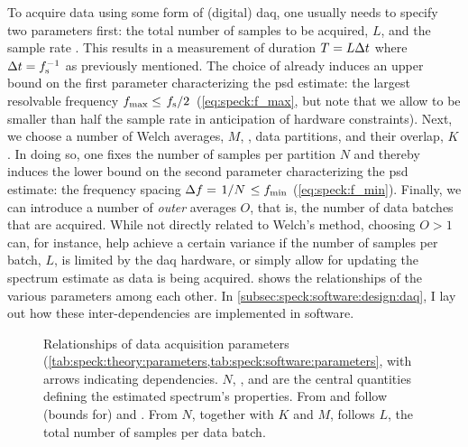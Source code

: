 To acquire data using some form of (digital) \gls{daq}, one usually needs to specify two parameters first: the total number of samples to be acquired, $L$, and the sample rate \fs.
This results in a measurement of duration $T = L\Delta t$ where $\Delta t = f_{\mathrm{s}}^{-1}$ as previously mentioned.
The choice of \fs already induces an upper bound on the first parameter characterizing the \gls{psd} estimate: the largest resolvable frequency $\fmax\leq\flatfrac{\fs}{2}$ (\cf \cref{eq:speck:f_max}, but note that we allow \fmax to be smaller than half the sample rate in anticipation of hardware constraints).
Next, we choose a number of Welch averages, $M$, \ie, data partitions, and their overlap, $K$.
In doing so, one fixes the number of samples per partition $N$ and thereby induces the lower bound on the second parameter characterizing the \gls{psd} estimate: the frequency spacing $\df = \flatfrac{1}{N} \leq \fmin$ (\cf \cref{eq:speck:f_min}).
Finally, we can introduce a number of \emph{outer} averages $O$, that is, the number of data batches that are acquired.
While not directly related to Welch's method, choosing $O > 1$ can, for instance, help achieve a certain variance if the number of samples per batch, $L$, is limited by the \acrlong{daq} hardware, or simply allow for updating the spectrum estimate as data is being acquired.
 shows the relationships of the various parameters among each other.
In \cref{subsec:speck:software:design:daq}, I lay out how these inter-dependencies are implemented in software.

\begin{figure}
    \centering
    
    \caption[]{
        Relationships of data acquisition parameters (\cf \cref{tab:speck:theory:parameters,tab:speck:software:parameters}, with arrows indicating dependencies.
        $N$, \fs, and \df are the central quantities defining the estimated spectrum's properties.
        From \fs and \df follow (bounds for) \fmax and \fmin.
        From $N$, together with $K$ and $M$, follows $L$, the total number of samples per data batch.
    }
    \label{fig:speck:theory:parameters}
\end{figure}

